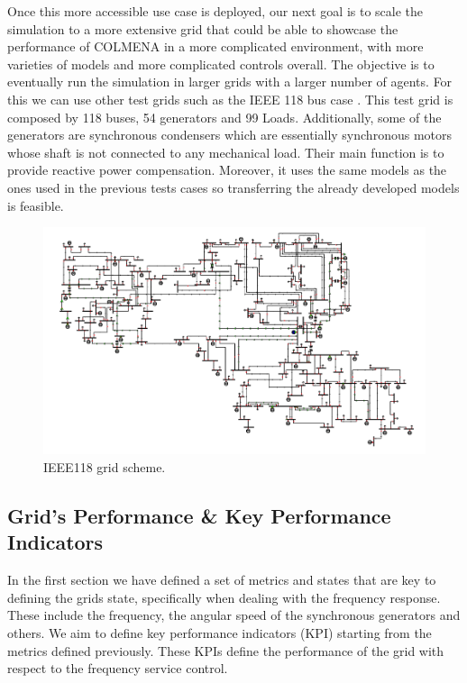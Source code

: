 \documentclass{article}
\begin{document}
Once this more accessible use case is deployed, our next goal is to scale the simulation to a more extensive grid that could be able to showcase the performance of COLMENA in a more complicated environment, with more varieties of models and more complicated controls overall. The objective is to eventually run the simulation in larger grids with a larger number of agents. For this we can use other test grids such as the IEEE 118 bus case \cite{grids:ieee118}. This test grid is composed by 118 buses, 54 generators and 99 Loads. Additionally, some of the generators are synchronous condensers which are essentially synchronous motors whose shaft is not connected to any mechanical load. Their main function is to provide reactive power compensation. Moreover, it uses the same models as the ones used in the previous tests cases so transferring the already developed models is feasible.

\begin{figure}[h!]
    \centering
    \includegraphics[width=1\textwidth]{pictures/IEEE118.png}
    \caption{IEEE118 grid scheme. \cite{grids:ieee118}}
    \label{fig:kundur}
\end{figure}

\subsection{Grid's Performance \& Key Performance Indicators}

In the first section we have defined a set of metrics and states that are key to defining the grids state, specifically when dealing with the frequency response. These include the frequency, the angular speed of the synchronous generators and others. We aim to define key performance indicators (KPI) starting from the metrics defined previously. These KPIs define the performance of the grid with respect to the frequency service control. 
\end{document}
